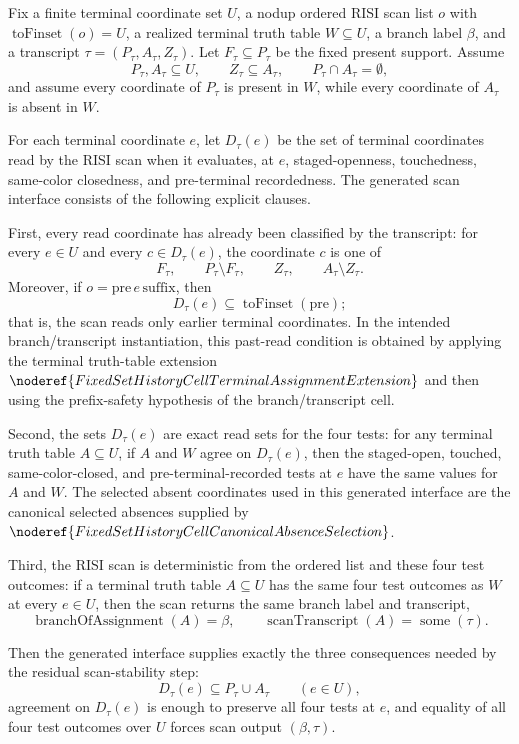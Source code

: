 \begin{helper}
Fix a finite terminal coordinate set \(U\), a nodup ordered RISI scan list
\(o\) with \(\operatorname{toFinset}(o)=U\), a realized terminal truth
table \(W\subseteq U\), a branch label \(\beta\), and a transcript
\(\tau=(P_\tau,A_\tau,Z_\tau)\).  Let \(F_\tau\subseteq P_\tau\) be the
fixed present support.  Assume
\[
P_\tau,A_\tau\subseteq U,\qquad
Z_\tau\subseteq A_\tau,\qquad
P_\tau\cap A_\tau=\emptyset,
\]
and assume every coordinate of \(P_\tau\) is present in \(W\), while every
coordinate of \(A_\tau\) is absent in \(W\).

For each terminal coordinate \(e\), let \(D_\tau(e)\) be the set of terminal
coordinates read by the RISI scan when it evaluates, at \(e\),
staged-openness, touchedness, same-color closedness, and pre-terminal
recordedness.  The generated scan interface consists of the following
explicit clauses.

First, every read coordinate has already been classified by the transcript:
for every \(e\in U\) and every \(c\in D_\tau(e)\), the coordinate \(c\) is
one of
\[
F_\tau,\qquad P_\tau\setminus F_\tau,\qquad
Z_\tau,\qquad A_\tau\setminus Z_\tau .
\]
Moreover, if \(o=\mathrm{pre}\, e\,\mathrm{suffix}\), then
\[
D_\tau(e)\subseteq \operatorname{toFinset}(\mathrm{pre});
\]
that is, the scan reads only earlier terminal coordinates.  In the intended
branch/transcript instantiation, this past-read condition is obtained by
applying the terminal truth-table extension
\(\noderef{FixedSetHistoryCellTerminalAssignmentExtension}\) and then using
the prefix-safety hypothesis of the branch/transcript cell.

Second, the sets \(D_\tau(e)\) are exact read sets for the four tests: for
any terminal truth table \(A\subseteq U\), if \(A\) and \(W\) agree on
\(D_\tau(e)\), then the staged-open, touched, same-color-closed, and
pre-terminal-recorded tests at \(e\) have the same values for \(A\) and
\(W\).  The selected absent coordinates used in this generated interface
are the canonical selected absences supplied by
\(\noderef{FixedSetHistoryCellCanonicalAbsenceSelection}\).

Third, the RISI scan is deterministic from the ordered list and these four
test outcomes: if a terminal truth table \(A\subseteq U\) has the same four
test outcomes as \(W\) at every \(e\in U\), then the scan returns the same
branch label and transcript,
\[
\operatorname{branchOfAssignment}(A)=\beta,\qquad
\operatorname{scanTranscript}(A)=\operatorname{some}(\tau).
\]

Then the generated interface supplies exactly the three consequences needed
by the residual scan-stability step:
\[
D_\tau(e)\subseteq P_\tau\cup A_\tau\qquad(e\in U),
\]
agreement on \(D_\tau(e)\) is enough to preserve all four tests at \(e\),
and equality of all four test outcomes over \(U\) forces scan output
\((\beta,\tau)\).
\end{helper}

